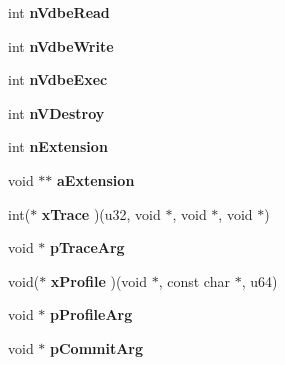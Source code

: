 \begin{DoxyCompactItemize}
\item 
int {\bfseries n\+Vdbe\+Read}\hypertarget{structsqlite3_a321880eb620a917a0b509f5629612227}{}\label{structsqlite3_a321880eb620a917a0b509f5629612227}

\item 
int {\bfseries n\+Vdbe\+Write}\hypertarget{structsqlite3_aa63da8ce693d136df02033f1bdb85171}{}\label{structsqlite3_aa63da8ce693d136df02033f1bdb85171}

\item 
int {\bfseries n\+Vdbe\+Exec}\hypertarget{structsqlite3_a4f4a211154ba0cfbd43c57e25640dfff}{}\label{structsqlite3_a4f4a211154ba0cfbd43c57e25640dfff}

\item 
int {\bfseries n\+V\+Destroy}\hypertarget{structsqlite3_adfa504e8c5d87a41e191236d0ba80f0a}{}\label{structsqlite3_adfa504e8c5d87a41e191236d0ba80f0a}

\item 
int {\bfseries n\+Extension}\hypertarget{structsqlite3_aa57fc38ef27d8fa59221cb5c0e54f7fb}{}\label{structsqlite3_aa57fc38ef27d8fa59221cb5c0e54f7fb}

\item 
void $\ast$$\ast$ {\bfseries a\+Extension}\hypertarget{structsqlite3_aa97954113d8e35c97f8a3af534703f7b}{}\label{structsqlite3_aa97954113d8e35c97f8a3af534703f7b}

\item 
int($\ast$ {\bfseries x\+Trace} )(u32, void $\ast$, void $\ast$, void $\ast$)\hypertarget{structsqlite3_ad1da15bd3930c142e5cfd09c560d9e3d}{}\label{structsqlite3_ad1da15bd3930c142e5cfd09c560d9e3d}

\item 
void $\ast$ {\bfseries p\+Trace\+Arg}\hypertarget{structsqlite3_ae0920576e4e92f1b736255fcfad649d1}{}\label{structsqlite3_ae0920576e4e92f1b736255fcfad649d1}

\item 
void($\ast$ {\bfseries x\+Profile} )(void $\ast$, const char $\ast$, u64)\hypertarget{structsqlite3_ab0aefde204a9c4dead89396ba929e5ca}{}\label{structsqlite3_ab0aefde204a9c4dead89396ba929e5ca}

\item 
void $\ast$ {\bfseries p\+Profile\+Arg}\hypertarget{structsqlite3_a931c234df9b701c78de38ddf22869062}{}\label{structsqlite3_a931c234df9b701c78de38ddf22869062}

\item 
void $\ast$ {\bfseries p\+Commit\+Arg}\hypertarget{structsqlite3_a355237725d3a535d702815b6ef8be75e}{}\label{structsqlite3_a355237725d3a535d702815b6ef8be75e}


\end{DoxyCompactItemize}
